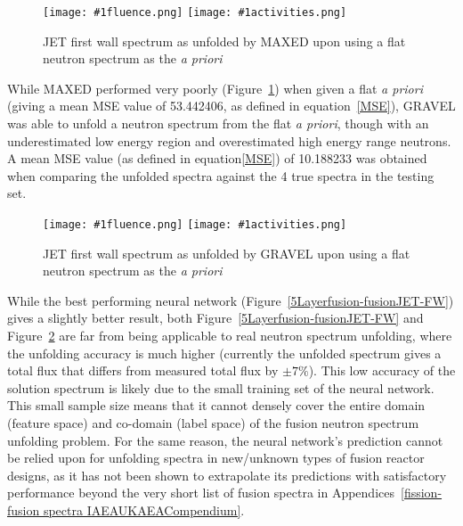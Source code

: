 \documentclass[a4paper, 12pt]{article}
\newcommand{\fluenceandactivities}[1]{
\texttt{[image: \#1fluence.png]}
\texttt{[image: \#1activities.png]}
}
\begin{document}
\begin{figure}[H]
\centering
    \fluenceandactivities{/home/ocean/Documents/GitHubDir/unfolding/unfolding/unfoldingsuite/neuralnetwork/realinputEarlyStopping/comparison/real_fusion_test_maxed_test_000_}
    \caption{JET first wall spectrum as unfolded by MAXED upon using a flat neutron spectrum as the \emph{a priori}}\label{maxed_flat_a_priori_JET}
\end{figure}
    
    While MAXED performed very poorly (Figure~\ref{maxed_flat_a_priori_JET}) when given a flat \emph{a priori} (giving a mean MSE value of 53.442406, as defined in equation~\ref{MSE}), GRAVEL was able to unfold a neutron spectrum from the flat \emph{a priori}, though with an underestimated low energy region and overestimated high energy range neutrons.
    A mean MSE value (as defined in equation\ref{MSE}) of 10.188233 was obtained when comparing the unfolded spectra against the 4 true spectra in the testing set.

\begin{figure}
\centering
    \fluenceandactivities{/home/ocean/Documents/GitHubDir/unfolding/unfolding/unfoldingsuite/neuralnetwork/realinputEarlyStopping/comparison/real_fusion_test_gravel_test_001_}
    \caption{JET first wall spectrum as unfolded by GRAVEL upon using a flat neutron spectrum as the \emph{a priori}}\label{gravel_flat_a_priori_JET}
\end{figure}

    While the best performing neural network (Figure~\ref{5Layerfusion-fusionJET-FW}) gives a slightly better result, both Figure~\ref{5Layerfusion-fusionJET-FW} and Figure~\ref{gravel_flat_a_priori_JET} are far from being applicable to real neutron spectrum unfolding, where the unfolding accuracy is much higher (currently the unfolded spectrum gives a total flux that differs from measured total flux by $\pm 7\%$\cite{bethColling_TBMD}). This low accuracy of the solution spectrum is likely due to the small training set of the neural network. This small sample size means that it cannot densely cover the entire domain (feature space) and co-domain (label space) of the fusion neutron spectrum unfolding problem. For the same reason, the neural network's prediction cannot be relied upon for unfolding spectra in new/unknown types of fusion reactor designs, as it has not been shown to extrapolate its predictions with satisfactory performance beyond the very short list of fusion spectra in Appendices~\ref{fission-fusion spectra IAEAUKAEACompendium}.
\end{document}
